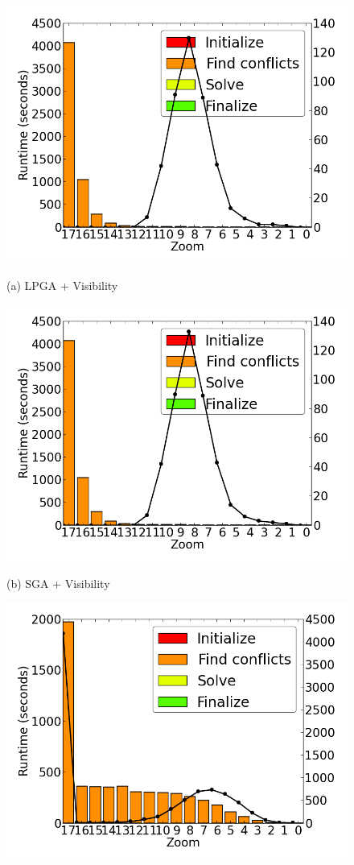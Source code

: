\begin{figure}[tb]
  \begin{minipage}{0.329\linewidth}
    \centerline{\includegraphics[width=0.9\linewidth]{./figs/prelim_lin_30k_uswaterway_heuristic_A.png}}
    \centerline{(a) LPGA + Visibility}
  \end{minipage} \hfill
  \begin{minipage}{0.329\linewidth}
    \centerline{\includegraphics[width=0.9\linewidth]{./figs/prelim_lin_30k_uswaterway_lp_A.png}}
    \centerline{(b) SGA + Visibility}
  \end{minipage} \hfill
  \begin{minipage}{0.329\linewidth}
    \centerline{\includegraphics[width=0.9\linewidth]{./figs/prelim_lin_30k_uswaterway_lp_B.png}}

\end{minipage}
\end{figure}
